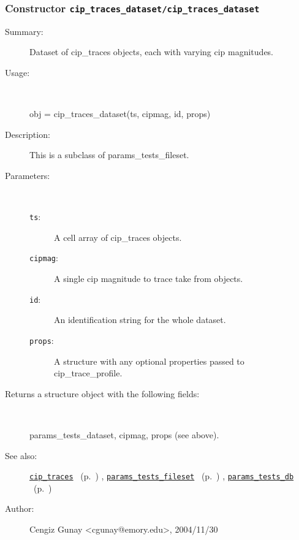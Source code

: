 \subsubsection[Constructor \texttt{cip\_traces\_dataset}]{Constructor \texttt{cip\_traces\_dataset/cip\_traces\_dataset}}%
%
\label{ref_cip_traces_dataset__cip_traces_dataset}%
\hypertarget{ref_cip_traces_dataset__cip_traces_dataset}{}%
\begin{description}
\item[Summary:]Dataset of cip\_traces objects, each with varying cip magnitudes.
%
\item[Usage:]~%
\begin{lyxcode}%
obj = cip\_traces\_dataset(ts, cipmag, id, props)
%
\end{lyxcode}%
%
\item[Description:]%
This is a subclass of params\_tests\_fileset.
\item[Parameters:]~
\begin{description}%
\item[\texttt{ts}:]
 A cell array of cip\_traces objects.
\item[\texttt{cipmag}:]
 A single cip magnitude to trace take from objects.
\item[\texttt{id}:]
 An identification string for the whole dataset.
\item[\texttt{props}:]
 A structure with any optional properties passed to cip\_trace\_profile.
\end{description}%
%
\item[Returns a structure object with the following fields:
]~

	params\_tests\_dataset,
	cipmag, props (see above).
%
%
\item[See also:]%
\hyperlink{ref_cip_traces}{\texttt{cip\_traces}}%
\ (p.~\pageref{ref_cip_traces})%
%
, \hyperlink{ref_params_tests_fileset}{\texttt{params\_tests\_fileset}}%
\ (p.~\pageref{ref_params_tests_fileset})%
%
, \hyperlink{ref_params_tests_db}{\texttt{params\_tests\_db}}%
\ (p.~\pageref{ref_params_tests_db})%
%
%
\item[Author:]%
Cengiz Gunay <cgunay@emory.edu>, 2004/11/30
%
\end{description}
\methodline%
